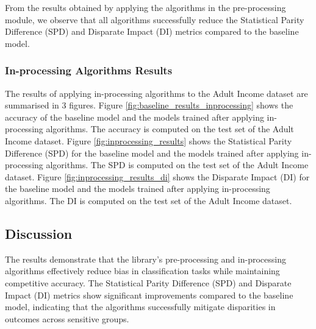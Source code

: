 \documentclass[12pt,a4paper,openright,twoside]{book}
\begin{document}
From the results obtained by applying the algorithms in the pre-processing module, we observe that all algorithms successfully reduce the Statistical Parity Difference (SPD) and Disparate Impact (DI) metrics compared to the baseline model.

\subsubsection{In-processing Algorithms Results}

The results of applying in-processing algorithms to the Adult Income dataset are summarised in 3 figures. Figure \ref{fig:baseline_results_inprocessing} shows the accuracy of the baseline model and the models trained after applying in-processing algorithms. The accuracy is computed on the test set of the Adult Income dataset.
Figure \ref{fig:inprocessing_results} shows the Statistical Parity Difference (SPD) for the baseline model and the models trained after applying in-processing algorithms. The SPD is computed on the test set of the Adult Income dataset. Figure \ref{fig:inprocessing_results_di} shows the Disparate Impact (DI) for the baseline model and the models trained after applying in-processing algorithms. The DI is computed on the test set of the Adult Income dataset.


\subsection{Discussion}
The results demonstrate that the library's pre-processing and in-processing algorithms effectively reduce bias in classification tasks while maintaining competitive accuracy. The Statistical Parity Difference (SPD) and Disparate Impact (DI) metrics show significant improvements compared to the baseline model, indicating that the algorithms successfully mitigate disparities in outcomes across sensitive groups.
\end{document}
